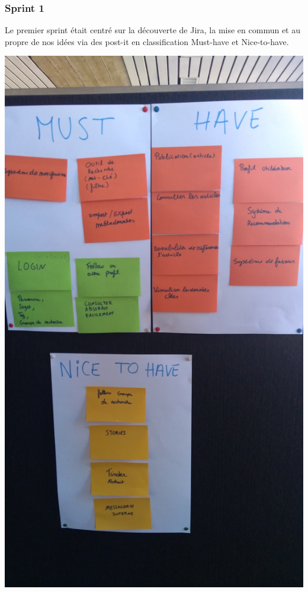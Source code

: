 \documentclass[t, 12pt, usenames,dvipsnames]{article}
\begin{document}
            \subsubsection{Sprint 1}
                \noindent Le premier sprint était centré sur la découverte de  Jira, la mise en commun et au propre de nos idées via des post-it en classification Must-have et Nice-to-have. 
                
                                
                 \begin{center}                       \includegraphics[scale=.07]{images/sprint/must-nice-have.jpg}
                    \label{fig:sprint1_graph}
                \end{center}
                
\end{document}
